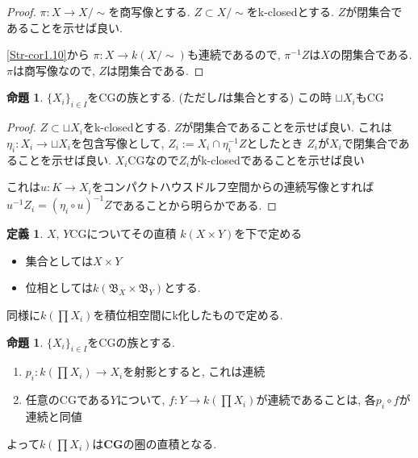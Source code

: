 \documentclass[dvipdfmx,a4paper,11pt]{article}
\theoremstyle{definition}
\newtheorem{prop}[thm]{命題}
\newtheorem{dfn}[thm]{定義}
\begin{document}
\begin{proof}
$\pi : X \to X/\sim$を商写像とする. 
$Z \subset X/\sim$をk-closedとする. $Z$が閉集合であることを示せば良い.

\ref{Str-cor1.10}から
$\pi : X \to k(X/\sim)$も連続であるので, $\pi^{-1}Z$は$X$の閉集合である.
$\pi$は商写像なので, $Z$は閉集合である. 
\end{proof}

 \begin{tcolorbox}
 [colback = white, colframe = green!35!black, fonttitle = \bfseries,breakable = true]
\begin{prop}\cite[Prop2.2]{Str}
\label{Str-prop2.2}
$\{ X_i \}_{i \in I}$をCGの族とする. (ただし$I$は集合とする)
この時
$\sqcup X_i$もCG
\end{prop}
\end{tcolorbox}
\begin{proof}
$Z \subset \sqcup X_i$をk-closedとする.
$Z$が閉集合であることを示せば良い. 
これは$\eta_i : X_i \to \sqcup X_i$を包含写像として, $Z_i := X_i \cap \eta_{i}^{-1}Z$としたとき
$Z_i$が$X_i$で閉集合であることを示せば良い.
$X_i$CGなので$Z_i$がk-closedであることを示せば良い

これは$u : K \to X_i$をコンパクトハウスドルフ空間からの連続写像とすれば
$u^{-1}Z_i = (\eta_i \circ u)^{-1}Z$であることから明らかである. 
\end{proof}


 \begin{tcolorbox}
 [colback = white, colframe = green!35!black, fonttitle = \bfseries,breakable = true]
\begin{dfn}\cite[Def 2.3]{Str}
\label{Str-def-2.3}
$X$, $Y$CGについてその直積
$k(X \times Y)$を下で定める
\begin{itemize}
\item 集合としては$X \times Y$
\item 位相としては$k(\mathfrak{B}_X \times \mathfrak{B}_Y)$とする.
\end{itemize}

同様に$k(\prod X_i)$を積位相空間にk化したもので定める. 
\end{dfn}
\end{tcolorbox}

 \begin{tcolorbox}
 [colback = white, colframe = green!35!black, fonttitle = \bfseries,breakable = true]
\begin{prop}\cite[Prop2.4]{Str}
$\{ X_i \}_{i \in I}$をCGの族とする.
\begin{enumerate}
\item $p_i : k(\prod X_i) \to X_i$を射影とすると, これは連続
\item 任意のCGである$Y$について, $f : Y \to k(\prod X_i)$が連続であることは, 各$p_i \circ f $が連続と同値
\end{enumerate}
よって$k(\prod X_i)$は{\bf CG}の圏の直積となる.
\end{prop}
\end{tcolorbox}
\end{document}
